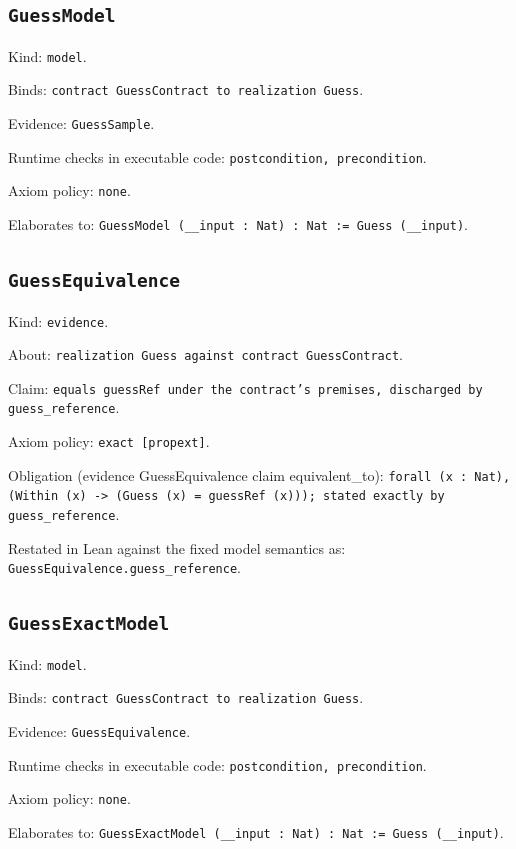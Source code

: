 \documentclass[11pt]{article}
\begin{document}
\subsection*{\texttt{GuessModel}}
\noindent Kind: \texttt{model}.\par
\noindent Binds: \texttt{contract GuessContract to realization Guess}.\par
\noindent Evidence: \texttt{GuessSample}.\par
\noindent Runtime checks in executable code: \texttt{postcondition, precondition}.\par
\noindent Axiom policy: \texttt{none}.\par
\noindent Elaborates to: \texttt{GuessModel (\_\_input : Nat) : Nat := Guess (\_\_input)}.\par
\subsection*{\texttt{GuessEquivalence}}
\noindent Kind: \texttt{evidence}.\par
\noindent About: \texttt{realization Guess against contract GuessContract}.\par
\noindent Claim: \texttt{equals guessRef under the contract's premises, discharged by guess\_reference}.\par
\noindent Axiom policy: \texttt{exact [propext]}.\par
\noindent Obligation (evidence GuessEquivalence claim equivalent\_to): \texttt{forall (x : Nat), (Within (x) -> (Guess (x) = guessRef (x))); stated exactly by guess\_reference}.\par
\noindent Restated in Lean against the fixed model semantics as: \texttt{GuessEquivalence.guess\_reference}.\par
\subsection*{\texttt{GuessExactModel}}
\noindent Kind: \texttt{model}.\par
\noindent Binds: \texttt{contract GuessContract to realization Guess}.\par
\noindent Evidence: \texttt{GuessEquivalence}.\par
\noindent Runtime checks in executable code: \texttt{postcondition, precondition}.\par
\noindent Axiom policy: \texttt{none}.\par
\noindent Elaborates to: \texttt{GuessExactModel (\_\_input : Nat) : Nat := Guess (\_\_input)}.\par
\end{document}
